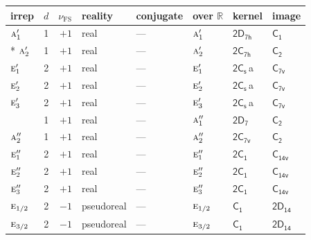 \documentclass[10pt,a4paper]{article}
\makeatletter
\def\grouprule#1#2{\noalign{\marks\LTgroupmarks{\the\belowrulesep}\nobreak\vskip#1%
  \vskip\aboverulesep}\multispan\LT@cols\unskip{\leaders\hrule\@height#2\hfill\kern\z@}\cr
  \noalign{\penalty\LTrulebreak\vskip\belowrulesep\global\@lastruleclass\z@}}
\numberwithin{equation}{section}
\newcommand{\grp}[1]{\mathsf{#1}}
\newcommand{\irr}[1]{\text{\normalfont\scshape #1}}
\newcommand{\detbox}[1]{{\setlength{\fboxsep}{1pt}\fbox{#1}}}
\newcommand{\clsletter}[1]{\,{\scriptsize\color{black!55}#1}}
\newcommand{\fsind}{\nu_{\mathrm{FS}}}
\makeatother
\begin{document}
\setlength{\emergencystretch}{2em}\par\setlength{\emergencystretch}{0pt}
{\small\renewcommand{\arraystretch}{1.25}\setlength{\tabcolsep}{4pt}\begin{longtable}{@{}lrrlllll@{}}\toprule
irrep & $d$ & $\fsind$ & reality & conjugate & over $\mathbb{R}$ & kernel & image\\\midrule\endhead
\bottomrule\endfoot\endlastfoot
$\irr{a}_{1}'$ & 1 & $+1$ & real & --- & $\irr{a}_{1}'$ & \href{2D7h.pdf}{$\grp{2D_{7h}}$} & \href{../../../rotation/data/pdf/C1.pdf}{$\grp{C_{1}}$}\\*
$\irr{a}_{2}'$ & 1 & $+1$ & real & --- & $\irr{a}_{2}'$ & \href{2C7h.pdf}{$\grp{2C_{7h}}$} & \href{../../../rotation/data/pdf/C2.pdf}{$\grp{C_{2}}$}\\
$\irr{e}_{1}'$ & 2 & $+1$ & real & --- & $\irr{e}_{1}'$ & \href{2C1v.pdf}{$\grp{2C_{s}}$}\clsletter{a} & \href{../../../rotation/data/pdf/C7v.pdf}{$\grp{C_{7v}}$}\\
$\irr{e}_{2}'$ & 2 & $+1$ & real & --- & $\irr{e}_{2}'$ & \href{2C1v.pdf}{$\grp{2C_{s}}$}\clsletter{a} & \href{../../../rotation/data/pdf/C7v.pdf}{$\grp{C_{7v}}$}\\
$\irr{e}_{3}'$ & 2 & $+1$ & real & --- & $\irr{e}_{3}'$ & \href{2C1v.pdf}{$\grp{2C_{s}}$}\clsletter{a} & \href{../../../rotation/data/pdf/C7v.pdf}{$\grp{C_{7v}}$}\\
\detbox{$\irr{a}_{1}''$} & 1 & $+1$ & real & --- & $\irr{a}_{1}''$ & \href{2D7.pdf}{$\grp{2D_{7}}$} & \href{../../../rotation/data/pdf/C2.pdf}{$\grp{C_{2}}$}\\
$\irr{a}_{2}''$ & 1 & $+1$ & real & --- & $\irr{a}_{2}''$ & \href{2C7v.pdf}{$\grp{2C_{7v}}$} & \href{../../../rotation/data/pdf/C2.pdf}{$\grp{C_{2}}$}\\
$\irr{e}_{1}''$ & 2 & $+1$ & real & --- & $\irr{e}_{1}''$ & \href{2C1.pdf}{$\grp{2C_{1}}$} & $\grp{C_{14v}}$\\
$\irr{e}_{2}''$ & 2 & $+1$ & real & --- & $\irr{e}_{2}''$ & \href{2C1.pdf}{$\grp{2C_{1}}$} & $\grp{C_{14v}}$\\
$\irr{e}_{3}''$ & 2 & $+1$ & real & --- & $\irr{e}_{3}''$ & \href{2C1.pdf}{$\grp{2C_{1}}$} & $\grp{C_{14v}}$\\
\grouprule{0pt}{\lightrulewidth}
$\irr{e}_{1/2}$ & 2 & $-1$ & pseudoreal & --- & $\irr{e}_{1/2}$ & \href{C1.pdf}{$\grp{C_{1}}$} & $\grp{2D_{14}}$\\
$\irr{e}_{3/2}$ & 2 & $-1$ & pseudoreal & --- & $\irr{e}_{3/2}$ & \href{C1.pdf}{$\grp{C_{1}}$} & $\grp{2D_{14}}$\\

\end{longtable}}
\end{document}
